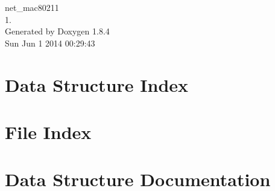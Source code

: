 \documentclass[twoside]{book}
\newcommand{\clearemptydoublepage}{%
  \newpage{\pagestyle{empty}\cleardoublepage}%
}
\begin{document}
\hypersetup{pageanchor=false}
\begin{titlepage}
\vspace*{7cm}
\begin{center}%
{\Large net\-\_\-mac80211 \\[1ex]\large 1. }\\
\vspace*{1cm}
{\large Generated by Doxygen 1.8.4}\\
\vspace*{0.5cm}
{\small Sun Jun 1 2014 00:29:43}\\
\end{center}
\end{titlepage}
\clearemptydoublepage
\tableofcontents
\clearemptydoublepage
{}
\hypersetup{pageanchor=true}

\chapter{Data Structure Index}

\chapter{File Index}

\chapter{Data Structure Documentation}





















































\end{document}
